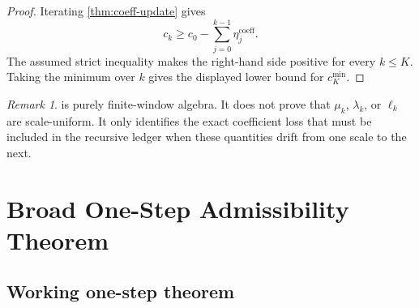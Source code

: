 \documentclass[11pt]{article}
\numberwithin{equation}{section}
\theoremstyle{plain}
\theoremstyle{definition}
\theoremstyle{remark}
\newtheorem{remark}[theorem]{Remark}
\begin{document}
\begin{proof}
Iterating \cref{thm:coeff-update} gives
\[
  c_k\ge c_0-\sum_{j=0}^{k-1}\eta_j^{\mathrm{coeff}}.
\]
The assumed strict inequality makes the right-hand side positive for every
\(k\le K\).  Taking the minimum over \(k\) gives the displayed lower bound for
\(c_K^{\min}\).
\end{proof}

\begin{remark}
 is purely finite-window algebra.  It does not prove
that \(\mu_k\), \(\lambda_k\), or \(\ell_k\) are scale-uniform.  It only
identifies the exact coefficient loss that must be included in the recursive
ledger when these quantities drift from one scale to the next.
\end{remark}


\section{Broad One-Step Admissibility Theorem}
\label{sec:main-results}

\subsection{Working one-step theorem}
\end{document}
